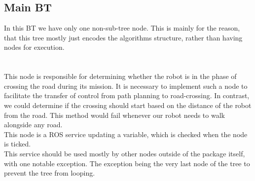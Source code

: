     \subsection{Main BT}
        In this BT we have only one non-sub-tree node. This is mainly for the reason, that this tree mostly just encodes the algorithms structure, rather than having nodes for execution.\\\\
        \\
        This node is responsible for determining whether the robot is in the phase of crossing the road during its mission. It is necessary to implement such a node to facilitate the transfer of control from path planning to road-crossing. In contrast, we could determine if the crossing should start based on the distance of the robot from the road. This method would fail whenever our robot needs to walk alongside any road.\\
        This node is a ROS service updating a variable, which is checked when the node is ticked.\\
        This service should be used mostly by other nodes outside of the package itself, with one notable exception. The exception being the very last node of the tree to prevent the tree from looping.
    
    
    
    